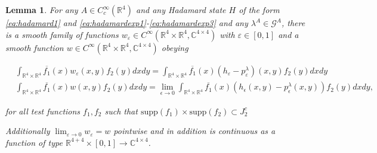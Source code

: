 \documentclass[a4paper,11pt]{article}
\newtheorem{lem}{Lemma}
\begin{document}
\begin{lem}\label{lem:pointwise}
For any \(A\in C_c^\infty(\mathbb{R}^4)\) and any Hadamard state \(H\) of the form \eqref{eq:hadamard1} and \eqref{eq:hadamardexp1}-\eqref{eq:hadamardexp3}
and any \(\lambda^A \in \mathcal{G}^A\),  there is a smooth family of
functions \(w_\varepsilon\in C^\infty(\mathbb{R}^4\times \mathbb{R}^4,\mathbb{C}^{4\times4})\) with \(\varepsilon \in [0,1]\) and a smooth function 
 \(w\in C^\infty(\mathbb{R}^4\times \mathbb{R}^4,\mathbb{C}^{4\times 4})\)  obeying
 
\begin{align}
&\int_{\mathbb{R}^4\times\mathbb{R}^4} \overline{f_1}(x) w_\varepsilon(x,y) f_2(y)dxdy =
\int_{\mathbb{R}^4\times\mathbb{R}^4} \overline{f_1}(x) (h_\varepsilon - p_\varepsilon^\lambda)(x,y) f_2(y)dxdy\\
&\int_{\mathbb{R}^4\times\mathbb{R}^4} \overline{f_1}(x) w(x,y)f_2(y)dxdy =
\lim_{\epsilon\rightarrow 0}\int_{\mathbb{R}^4\times\mathbb{R}^4} \overline{f_1}(x)(h_\epsilon (x,y)-p^\lambda_\epsilon(x,y)) f_2(y)dxdy,
\end{align}

for all test functions \(f_1,f_2\) such that \(\mathrm{supp}(f_1)\times\mathrm{supp}(f_2)\subset J_2^c\)
 
Additionally \(\lim_{\varepsilon \rightarrow 0}w_\varepsilon=w\) pointwise and in addition 
is continuous as a function of type \(\mathbb{R}^{4+4} \times[0,1]\rightarrow \mathbb{C}^{4\times 4}\).
\end{lem}
\end{document}
